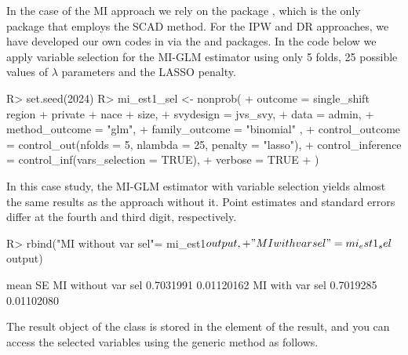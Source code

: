 \documentclass[
]{jss}
\begin{document}
In the case of the MI approach we rely on the  package
\citep{ncvreg}, which is the only  package that employs the
SCAD method. For the IPW and DR approaches, we have developed our own
codes in  via the  and 
packages. In the code below we apply variable selection for the MI-GLM
estimator using only 5 folds, 25 possible values of \(\lambda\)
parameters and the LASSO penalty.

\begin{CodeChunk}
\begin{CodeInput}
R> set.seed(2024)
R> mi_est1_sel <- nonprob(
+   outcome = single_shift ~ region + private + nace + size,
+   svydesign = jvs_svy,
+   data = admin,
+   method_outcome = "glm",
+   family_outcome = "binomial" ,
+   control_outcome = control_out(nfolds = 5, nlambda = 25, penalty = "lasso"),
+   control_inference = control_inf(vars_selection = TRUE),
+   verbose = TRUE
+ )
\end{CodeInput}
\end{CodeChunk}

In this case study, the MI-GLM estimator with variable selection yields
almost the same results as the approach without it. Point estimates and
standard errors differ at the fourth and third digit, respectively.

\begin{CodeChunk}
\begin{CodeInput}
R> rbind("MI without var sel"= mi_est1$output,
+       "MI with var sel"   = mi_est1_sel$output)
\end{CodeInput}
\begin{CodeOutput}
                        mean         SE
MI without var sel 0.7031991 0.01120162
MI with var sel    0.7019285 0.01102080
\end{CodeOutput}
\end{CodeChunk}

The result object of the  class is stored in the
 element of the result, and you can access the selected
variables using the  generic method as follows.
\end{document}
